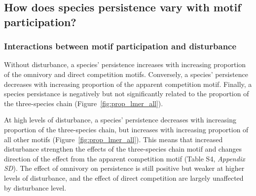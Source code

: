 \documentclass[12pt]{article}
\begin{document}
\begin{spacing}{2.0}
    \clearpage

    \subsection*{How does species persistence vary with motif participation?} 
    
    
        \subsubsection*{Interactions between motif participation and disturbance}
        
            Without disturbance, a species' persistence increases with increasing proportion of the omnivory and direct competition motifs. Conversely, a species' persistence decreases with increasing proportion of the apparent competition motif. Finally, a species persistance is  negatively but not significantly related to the proportion of the three-species chain (Figure~\ref{fig:prop_lmer_all}).
            
            At high levels of disturbance, a species' persistence decreases with increasing proportion of the three-species chain, but increases with increasing proportion of all other motifs (Figure~\ref{fig:prop_lmer_all}).
            This means that increased disturbance strengthen the effects of the three-species chain motif and changes direction of the effect from the apparent competition motif  (Table S4, \emph{Appendix SD}).
            The effect of omnivory on persistence is still positive but weaker at higher levels of disturbance, and the effect of direct competition are largely unaffected by disturbance level.
    

\end{spacing}
\end{document}
